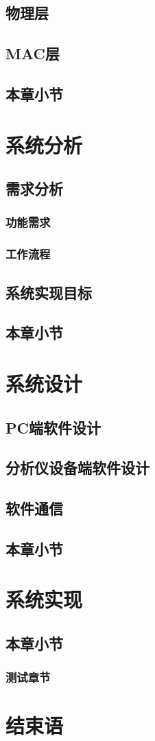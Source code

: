 \section{物理层}
\section{MAC层}
\section{本章小节}

\chapter{系统分析}
\section{需求分析}
\subsection{功能需求}
\subsection{工作流程}

\section{系统实现目标}

\section{本章小节}


\chapter{系统设计}
\section{PC端软件设计}
\section{分析仪设备端软件设计}
\section{软件通信}
\section{本章小节}
\chapter{系统实现}

\section{本章小节}
\subsection{测试章节}

\chapter{结束语}


